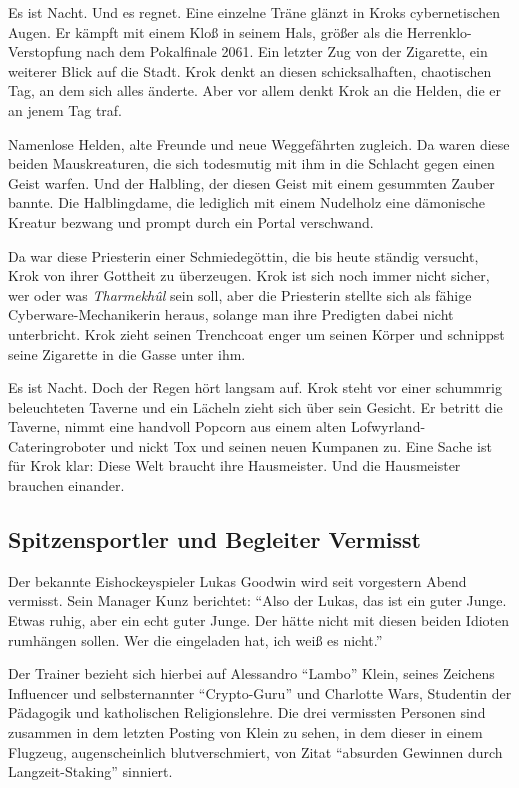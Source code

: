 \documentclass[final]{multiversum}
\begin{document}
Es ist Nacht. Und es regnet. Eine einzelne Träne glänzt in Kroks cybernetischen
Augen. Er kämpft mit einem Kloß in seinem Hals, größer als die
Herrenklo-Verstopfung nach dem Pokalfinale 2061. Ein letzter Zug von der
Zigarette, ein weiterer Blick auf die Stadt. Krok denkt an diesen
schicksalhaften, chaotischen Tag, an dem sich alles änderte. Aber vor allem
denkt Krok an die Helden, die er an jenem Tag traf.

Namenlose Helden, alte Freunde und neue Weggefährten zugleich. Da waren diese
beiden Mauskreaturen, die sich todesmutig mit ihm in die Schlacht gegen einen
Geist warfen. Und der Halbling, der diesen Geist mit einem gesummten Zauber
bannte. Die Halblingdame, die lediglich mit einem Nudelholz eine
dämonische Kreatur bezwang und prompt durch ein Portal verschwand.

Da war diese Priesterin einer Schmiedegöttin, die bis heute ständig versucht,
Krok von ihrer Gottheit zu überzeugen. Krok ist sich noch immer nicht sicher,
wer oder was \emph{Tharmekhûl} sein soll, aber die Priesterin stellte sich als
fähige Cyberware-Mechanikerin heraus, solange man ihre Predigten dabei nicht
unterbricht. Krok zieht seinen Trenchcoat enger um seinen Körper und schnippst
seine Zigarette in die Gasse unter ihm.

Es ist Nacht. Doch der Regen hört langsam auf. Krok steht vor einer schummrig
beleuchteten Taverne und ein Lächeln zieht sich über sein Gesicht. Er betritt
die Taverne, nimmt eine handvoll Popcorn aus einem alten
Lofwyrland-Cateringroboter und nickt Tox und seinen neuen Kumpanen zu. Eine
Sache ist für Krok klar: Diese Welt braucht ihre Hausmeister. Und die
Hausmeister brauchen einander.  

\subsection{Spitzensportler und Begleiter Vermisst}
Der bekannte Eishockeyspieler Lukas Goodwin wird seit vorgestern Abend vermisst.
Sein Manager Kunz berichtet: \enquote{Also der Lukas, das ist ein guter Junge.
Etwas ruhig, aber ein echt guter Junge. Der hätte nicht mit diesen beiden
Idioten rumhängen sollen. Wer die eingeladen hat, ich weiß es nicht.}

Der Trainer bezieht sich hierbei auf Alessandro \enquote{Lambo} Klein, seines
Zeichens Influencer und selbsternannter \enquote{Crypto-Guru} und Charlotte
Wars, Studentin der Pädagogik und katholischen Religionslehre. Die drei
vermissten Personen sind zusammen in dem letzten Posting von Klein zu sehen, in
dem dieser in einem Flugzeug, augenscheinlich blutverschmiert, von \textendash{}
Zitat \textendash{} \enquote{absurden Gewinnen durch Langzeit-Staking} sinniert.
\end{document}
